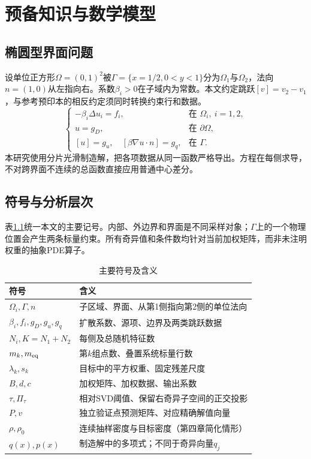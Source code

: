 \chapter{预备知识与数学模型}
\section{椭圆型界面问题}
设单位正方形$\Omega=(0,1)^2$被$\Gamma=\{x=1/2,0<y<1\}$分为$\Omega_1$与$\Omega_2$，法向$n=(1,0)$从左指向右。系数$\beta_i>0$在子域内为常数。本文约定跳跃$[v]=v_2-v_1$，与参考预印本的相反约定须同时转换约束行和数据。
\begin{equation}\label{eq:interface}
\begin{cases}
-\beta_i\Delta u_i=f_i,&\text{在 }\Omega_i,\ i=1,2,\\
u=g_D,&\text{在 }\partial\Omega,\\
[u]=g_u,\quad[\beta\nabla u\cdot n]=g_q,&\text{在 }\Gamma.
\end{cases}
\end{equation}
本研究使用分片光滑制造解，把各项数据从同一函数严格导出。方程在每侧求导，不对跨界面不连续的总函数直接应用普通中心差分。

\section{符号与分析层次}
表\ref{tab:symbols}统一本文的主要记号。内部、外边界和界面是不同采样对象；$\Gamma$上的一个物理位置会产生两条标量约束。所有奇异值和条件数均针对当前加权矩阵，而非未注明权重的抽象PDE算子。
\begin{table}[htbp]\centering\small
\caption{主要符号及含义}\label{tab:symbols}
\begin{tabular}{ll}\toprule
符号 & 含义\\\midrule
$\Omega_i,\Gamma,n$ & 子区域、界面、从第1侧指向第2侧的单位法向\\
$\beta_i,f_i,g_D,g_u,g_q$ & 扩散系数、源项、边界及两类跳跃数据\\
$N_i,K=N_1+N_2$ & 每侧及总随机特征数\\
$m_k,m_{\rm eq}$ & 第$k$组点数、叠置系统标量行数\\
$\lambda_k,s_k$ & 目标中的平方权重、固定残差尺度\\
$B,d,c$ & 加权矩阵、加权数据、输出系数\\
$\tau,\Pi_\tau$ & 相对SVD阈值、保留右奇异子空间的正交投影\\
$P,v$ & 独立验证点预测矩阵、对应精确解值向量\\
$\rho,\rho_0$ & 连续抽样密度与目标密度（第四章简化情形）\\
$q(x),p(x)$ & 制造解中的多项式；不同于奇异向量$q_j$\\
\bottomrule\end{tabular}\end{table}

